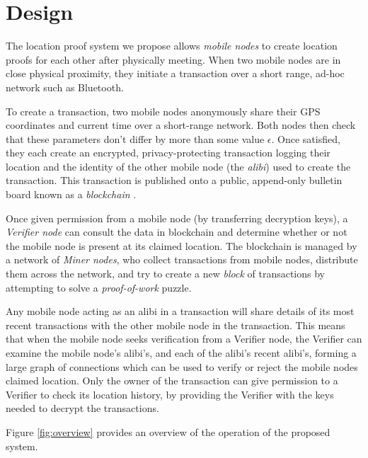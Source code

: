\section{Design}
The location proof system we propose allows \textit{mobile nodes} to create location proofs for each other after physically meeting. When two mobile nodes are in close physical proximity, they initiate a transaction over a short range, ad-hoc network such as Bluetooth.

To create a transaction, two mobile nodes anonymously share their GPS coordinates and current time over a short-range network. Both nodes then check that these parameters don't differ by more than some value $\epsilon$. Once satisfied, they each create an encrypted, privacy-protecting transaction logging their location and the identity of the other mobile node (the \textit{alibi}) used to create the transaction. This transaction is published onto a public, append-only bulletin board known as a \textit{blockchain} \cite{blueprint}.

Once given permission from a mobile node (by transferring decryption keys), a \textit{Verifier node} can consult the data in blockchain and determine whether or not the mobile node is present at its claimed location. The blockchain is managed by a network of \textit{Miner nodes}, who collect transactions from mobile nodes, distribute them across the network, and try to create a new \textit{block} of transactions by attempting to solve a \textit{proof-of-work} puzzle.

Any mobile node acting as an alibi in a transaction will share details of its most recent transactions with the other mobile node in the transaction. This means that when the mobile node seeks verification from a Verifier node, the Verifier can examine the mobile node's alibi's, and each of the alibi's recent alibi's, forming a large graph of connections which can be used to verify or reject the mobile nodes claimed location. Only the owner of the transaction can give permission to a Verifier to check its location history, by providing the Verifier with the keys needed to decrypt the transactions.

Figure \ref{fig:overview} provides an overview of the operation of the proposed system.

